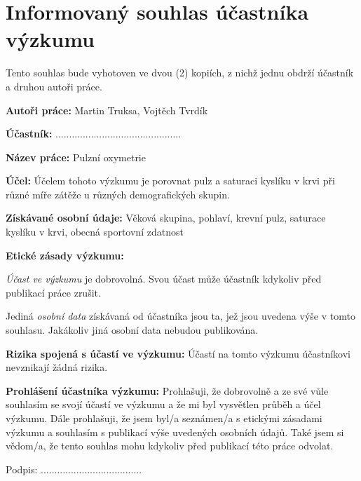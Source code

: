 \section{Informovaný souhlas účastníka výzkumu}
\noindent Tento souhlas bude vyhotoven ve dvou (2) kopiích, z nichž jednu obdrží účastník a druhou autoři práce.\par
\noindent\textbf{Autoři práce: } Martin Truksa, Vojtěch Tvrdík\par
\noindent\textbf{Účastník: }..............................................\par
\noindent\textbf{Název práce: } Pulzní oxymetrie\par
\noindent\textbf{Účel: } Účelem tohoto výzkumu je porovnat pulz a saturaci kyslíku v krvi při různé míře zátěže u různých demografických skupin.\par
\noindent\textbf{Získávané osobní údaje: } Věková skupina, pohlaví, krevní pulz, saturace kyslíku v krvi, obecná sportovní zdatnost\par
\noindent\textbf{Etické zásady výzkumu: }\par
\emph{Účast ve výzkumu} je dobrovolná. Svou účast může účastník kdykoliv před publikací práce zrušit.\par
Jediná \emph{osobní data} získávaná od účastníka jsou ta, jež jsou uvedena výše v tomto souhlasu. Jakákoliv jiná osobní data nebudou publikována.\par
\noindent\textbf{Rizika spojená s účastí ve výzkumu: } Účastí na tomto výzkumu účastníkovi nevznikají žádná rizika.\par
\noindent\textbf{Prohlášení účastníka výzkumu: } Prohlašuji, že dobrovolně a ze své vůle souhlasím se svojí účastí ve výzkumu a že mi byl vysvětlen průběh a účel výzkumu. Dále prohlašuji, že jsem byl/a seznámen/a s etickými zásadami výzkumu a souhlasím s publikací výše uvedených osobních údajů. Také jsem si vědom/a, že tento souhlas mohu kdykoliv před publikací této práce odvolat.
\vfill
\begin{flushright}Podpis: .....................................\end{flushright}